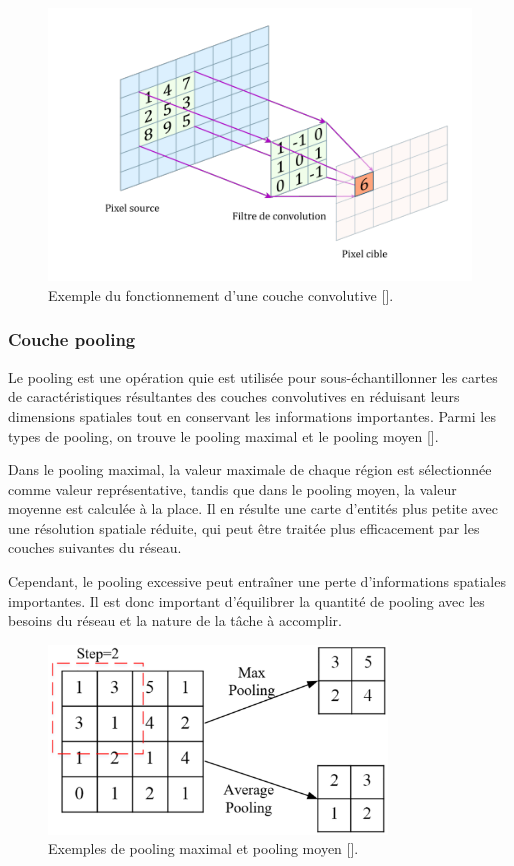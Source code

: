 \begin{figure}[hbt!]
	\centering
	\includegraphics[width=12
		cm]{images_pfe/layerconv.png}
	\caption{Exemple du fonctionnement d'une couche convolutive [\cite{kimura_yoshinaga_sekijima_azechi_baba_2019}].}
	\label{fig:conv}
\end{figure}
\FloatBarrier
\medskip

\subsubsection{Couche pooling}
Le pooling est une opération quie est utilisée pour sous-échantillonner les
cartes de caractéristiques résultantes des couches convolutives en réduisant
leurs dimensions spatiales tout en conservant les informations importantes.
Parmi les types de pooling, on trouve le pooling maximal et le pooling moyen
	[\cite{Goodfellow-et-al-2016}].

\medskip
Dans le pooling maximal, la valeur maximale de chaque région est sélectionnée comme valeur représentative, tandis que dans le pooling moyen, la valeur moyenne est calculée à la place. Il en résulte une carte d'entités plus petite avec une résolution spatiale réduite, qui peut être traitée plus efficacement par les couches suivantes du réseau.

\medskip
Cependant, le pooling excessive peut entraîner une perte d'informations spatiales importantes. Il est donc important d'équilibrer la quantité de pooling avec les besoins du réseau et la nature de la tâche à accomplir.

\begin{figure}[hbt!]
	\centering
	\includegraphics[width=9cm]{images_pfe/pooling.png}
	\caption{Exemples de pooling maximal et pooling moyen [\cite{hu_wu_xu_lai_xia_2022}].}
	\label{fig:pooling}
\end{figure}
\FloatBarrier
\medskip

